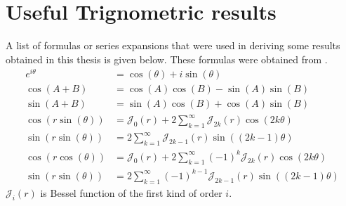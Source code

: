 %

\chapter{Useful Trignometric results} \label{app:trig}
A list of formulas or series expansions that were used in deriving some results obtained in this thesis is given below.
These formulas were obtained from \parencite{abramowitz2012handbook}.
\begin{align}
  e^{i\theta} &= \cos(\theta) + i\sin(\theta) \\
  \cos(A + B) &= \cos(A) \cos(B) - \sin(A)\sin(B) \\
  \sin(A + B) &= \sin(A) \cos(B) + \cos(A)\sin(B) \\
  \cos(r\sin(\theta)) &= \mathcal{J}_{0}(r) + 2\sum_{k=1}^{\infty}\mathcal{J}_{2k}(r) \cos(2k\theta) \\
  \sin(r\sin(\theta)) &= 2\sum_{k=1}^{\infty}\mathcal{J}_{2k-1}(r) \sin((2k-1)\theta) \\
  \cos(r\cos(\theta)) &= \mathcal{J}_{0}(r) + 2\sum_{k=1}^{\infty}(-1)^{k}\mathcal{J}_{2k}(r) \cos(2k\theta) \\
  \sin(r\sin(\theta)) &= 2\sum_{k=1}^{\infty}(-1)^{k-1}\mathcal{J}_{2k-1}(r) \sin((2k-1)\theta)
\end{align}
$\mathcal{J}_{i}(r)$ is Bessel function of the first kind of order $i$.
% 
